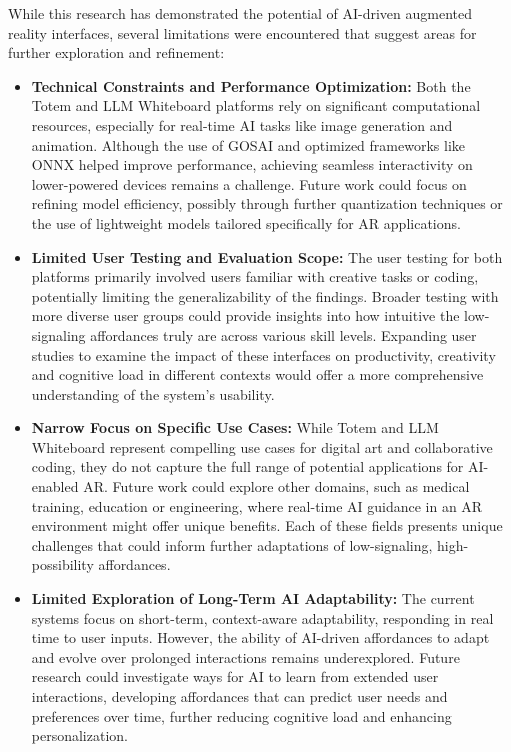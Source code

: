 While this research has demonstrated the potential of AI-driven augmented reality interfaces, several limitations were encountered that suggest areas for further exploration and refinement:
\begin{itemize}

    \item \textbf{Technical Constraints and Performance Optimization:}
    Both the Totem and LLM Whiteboard platforms rely on significant computational resources, especially for real-time AI tasks like image generation and animation.
    Although the use of GOSAI and optimized frameworks like ONNX helped improve performance, achieving seamless interactivity on lower-powered devices remains a challenge.
    Future work could focus on refining model efficiency, possibly through further quantization techniques or the use of lightweight models tailored specifically for AR applications.
    
    \item \textbf{Limited User Testing and Evaluation Scope:}
    The user testing for both platforms primarily involved users familiar with creative tasks or coding, potentially limiting the generalizability of the findings.
    Broader testing with more diverse user groups could provide insights into how intuitive the low-signaling affordances truly are across various skill levels.
    Expanding user studies to examine the impact of these interfaces on productivity, creativity and cognitive load in different contexts would offer a more comprehensive understanding of the system’s usability.
    
    \item \textbf{Narrow Focus on Specific Use Cases:}
    While Totem and LLM Whiteboard represent compelling use cases for digital art and collaborative coding, they do not capture the full range of potential applications for AI-enabled AR.
    Future work could explore other domains, such as medical training, education or engineering, where real-time AI guidance in an AR environment might offer unique benefits.
    Each of these fields presents unique challenges that could inform further adaptations of low-signaling, high-possibility affordances.
    
    \item \textbf{Limited Exploration of Long-Term AI Adaptability:}
    The current systems focus on short-term, context-aware adaptability, responding in real time to user inputs.
    However, the ability of AI-driven affordances to adapt and evolve over prolonged interactions remains underexplored.
    Future research could investigate ways for AI to learn from extended user interactions, developing affordances that can predict user needs and preferences over time, further reducing cognitive load and enhancing personalization.

\end{itemize}

